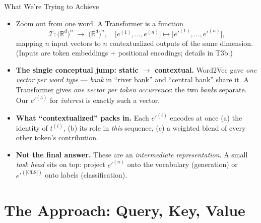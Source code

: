 \begin{frame}{What We're Trying to Achieve}
\begin{itemize}
\item Zoom out from one word. A Transformer is a function
\[
   \mathcal{T}\colon \bigl(\mathbb{R}^{d}\bigr)^{n} \;\longrightarrow\; \bigl(\mathbb{R}^{d}\bigr)^{n},
   \quad \bigl[e^{(1)}, \ldots, e^{(n)}\bigr] \mapsto \bigl[e'^{(1)}, \ldots, e'^{(n)}\bigr],
\]
mapping $n$ input vectors to $n$ contextualized outputs of the same dimension. (Inputs are token embeddings $+$ positional encodings; details in T3b.)
\smallskip
\item \textbf{The single conceptual jump: static $\to$ contextual.} Word2Vec gave \emph{one vector per word type} --- \emph{bank} in ``river bank'' and ``central bank'' share it. A Transformer gives \emph{one vector per token occurrence}: the two \emph{bank}s separate. Our $e'^{(5)}$ for \emph{interest} is exactly such a vector.
\smallskip
\item \textbf{What ``contextualized'' packs in.} Each $e'^{(i)}$ encodes at once (a) the identity of $t^{(i)}$, (b) its role in \emph{this} sequence, (c) a weighted blend of every other token's contribution.
\smallskip
\item \textbf{Not the final answer.} These are an \emph{intermediate representation}. A small \emph{task head} sits on top: project $e'^{(n)}$ onto the vocabulary (generation) or $e'^{(\text{[CLS]})}$ onto labels (classification).
\end{itemize}
\end{frame}

\section{The Approach: Query, Key, Value}

